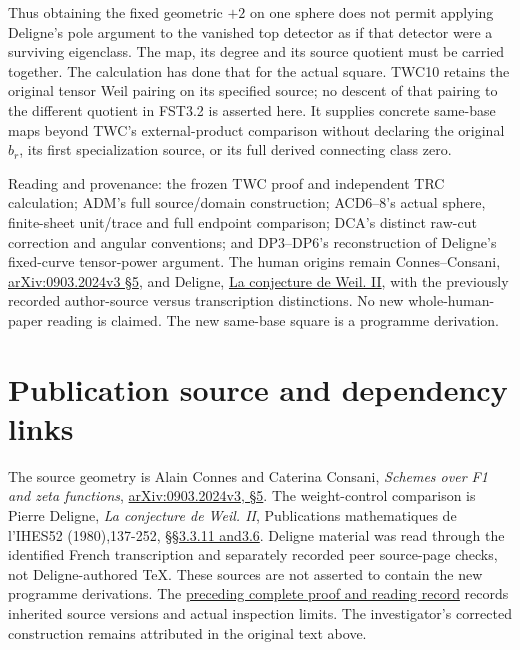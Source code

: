 Thus obtaining the fixed geometric \(+2\) on one sphere does not permit
applying Deligne's pole argument to the vanished top detector as if that
detector were a surviving eigenclass. The map, its degree and its source
quotient must be carried together. The calculation has done that for the
actual square. TWC10 retains the original tensor Weil pairing on its
specified source; no descent of that pairing to the different quotient
in FST3.2 is asserted here. It supplies concrete same-base maps beyond
TWC's external-product comparison without declaring the original
\(b_r\), its first specialization source, or its full derived connecting
class zero.

Reading and provenance: the frozen TWC proof and independent TRC
calculation; ADM's full source/domain construction; ACD6--8's actual
sphere, finite-sheet unit/trace and full endpoint comparison; DCA's
distinct raw-cut correction and angular conventions; and DP3--DP6's
reconstruction of Deligne's fixed-curve tensor-power argument. The human
origins remain Connes--Consani,
\href{https://arxiv.org/abs/0903.2024v3}{arXiv:0903.2024v3 §5}, and
Deligne, \href{https://numdam.org/item/PMIHES_1980__52__137_0/}{La
conjecture de Weil. II}, with the previously recorded author-source
versus transcription distinctions. No new whole-human-paper reading is
claimed. The new same-base square is a programme derivation.

\section{Publication source and dependency
links}\label{publication-source-and-dependency-links-12}

The source geometry is Alain Connes and Caterina Consani, \emph{Schemes
over F1 and zeta functions},
\href{https://arxiv.org/abs/0903.2024v3}{arXiv:0903.2024v3, §5}. The
weight-control comparison is Pierre Deligne, \emph{La conjecture de
Weil. II}, Publications mathematiques de l'IHES52 (1980),137-252,
\href{https://www.numdam.org/item/PMIHES_1980__52__137_0/}{§§3.3.11
and3.6}. Deligne material was read through the identified French
transcription and separately recorded peer source-page checks, not
Deligne-authored TeX. These sources are not asserted to contain the new
programme derivations. The
\href{https://github.com/KokunoYumeto/zeta-function-research-reader/blob/36a82ecca98addb8a98b48204e349737856c7223/workbenches/splitzero-tandem/continuations/20260924-cohomology-weight-and-character-lifts/BUILD_AND_REVIEW.md}{preceding
complete proof and reading record} records inherited source versions and
actual inspection limits. The investigator's corrected construction
remains attributed in the original text above.

